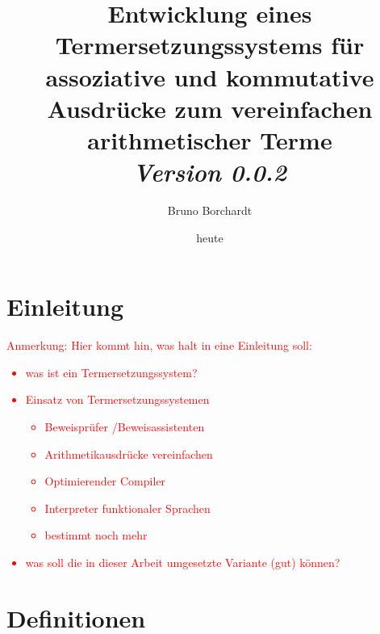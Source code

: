 \documentclass{article}
\title{Entwicklung eines Termersetzungssystems für assoziative und kommutative Ausdrücke zum vereinfachen arithmetischer Terme\\ \textit{Version 0.0.2}}
\author{Bruno Borchardt}
\date{heute}
\begin{document}
\maketitle

\tableofcontents

\clearpage

\section{Einleitung}
\textcolor{red} {
\begin{itshape}
Anmerkung: Hier kommt hin, was halt in eine Einleitung soll:
\begin{itemize}
    \item was ist ein Termersetzungssystem?
    \item Einsatz von Termersetzungssystemen
    \begin{itemize}
        \item Beweisprüfer /Beweisassistenten
        \item Arithmetikausdrücke vereinfachen
        \item Optimierender Compiler
	\item Interpreter funktionaler Sprachen
        \item bestimmt noch mehr
    \end{itemize}
    \item was soll die in dieser Arbeit umgesetzte Variante (gut) können?
\end{itemize}
\end{itshape}
}

\section{Definitionen}
\end{document}
